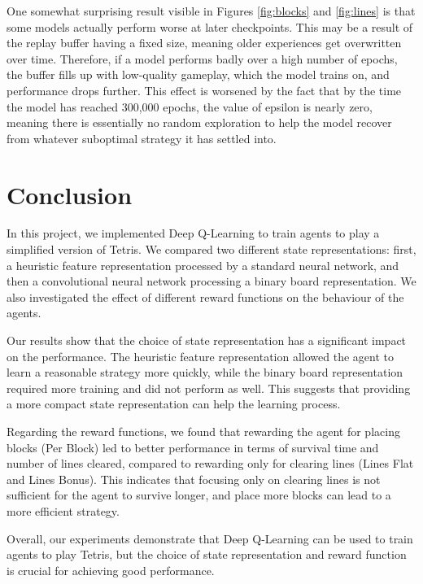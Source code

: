 \documentclass[12pt]{article}
\begin{document}
One somewhat surprising result visible in Figures \ref{fig:blocks} and \ref{fig:lines} is that some models actually perform worse at later checkpoints. This may be a result of the replay buffer having a fixed size, meaning older experiences get overwritten over time. Therefore, if a model performs badly over a high number of epochs, the buffer fills up with low-quality gameplay, which the model trains on, and performance drops further. This effect is worsened by the fact that by the time the model has reached 300,000 epochs, the value of epsilon is nearly zero, meaning there is essentially no random exploration to help the model recover from whatever suboptimal strategy it has settled into.

\section{Conclusion}

In this project, we implemented Deep Q-Learning to train agents to play a simplified version of Tetris. We compared two different state representations: first, a heuristic feature representation processed by a standard neural network, and then a convolutional neural network processing a binary board representation. We also investigated the effect of different reward functions on the behaviour of the agents.

Our results show that the choice of state representation has a significant impact on the performance. The heuristic feature representation allowed the agent to learn a reasonable strategy more quickly, while the binary board representation required more training and did not perform as well. This suggests that providing a more compact state representation can help the learning process.

Regarding the reward functions, we found that rewarding the agent for placing blocks (Per Block) led to better performance in terms of survival time and number of lines cleared, compared to rewarding only for clearing lines (Lines Flat and Lines Bonus). This indicates that focusing only on clearing lines is not sufficient for the agent to survive longer, and place more blocks can lead to a more efficient strategy.

Overall, our experiments demonstrate that Deep Q-Learning can be used to train agents to play Tetris, but the choice of state representation and reward function is crucial for achieving good performance.

\newpage
\printbibliography
\end{document}
